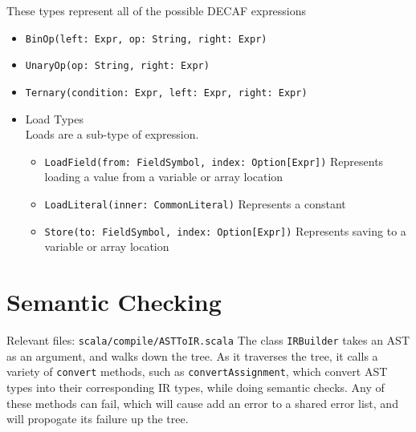 \documentclass[11pt]{article}
\begin{document}
    These types represent all of the possible DECAF expressions
\begin{itemize}
\item \verb~BinOp(left: Expr, op: String, right: Expr)~
\item \verb~UnaryOp(op: String, right: Expr)~
\item \verb~Ternary(condition: Expr, left: Expr, right: Expr)~
\end{itemize}
\begin{itemize}

\item Load Types\\
\label{sec-2-3-2-1}%
Loads are a sub-type of expression.
\begin{itemize}
\item \verb~LoadField(from: FieldSymbol, index: Option[Expr])~ Represents loading a value from a variable or array location
\item \verb~LoadLiteral(inner: CommonLiteral)~ Represents a constant
\item \verb~Store(to: FieldSymbol, index: Option[Expr])~ Represents saving to a variable or array location
\end{itemize}

\end{itemize} %
\section{Semantic Checking}
\label{sec-3}

  Relevant files: \verb~scala/compile/ASTToIR.scala~
  The class \verb~IRBuilder~ takes an AST as an argument, and walks down the tree.
  As it traverses the tree, it calls a variety of \verb~convert~ methods, such as \verb~convertAssignment~, which convert AST types into their corresponding IR types, while doing semantic checks.
  Any of these methods can fail, which will cause add an error to a shared error list, and will propogate its failure up the tree.
\end{document}

